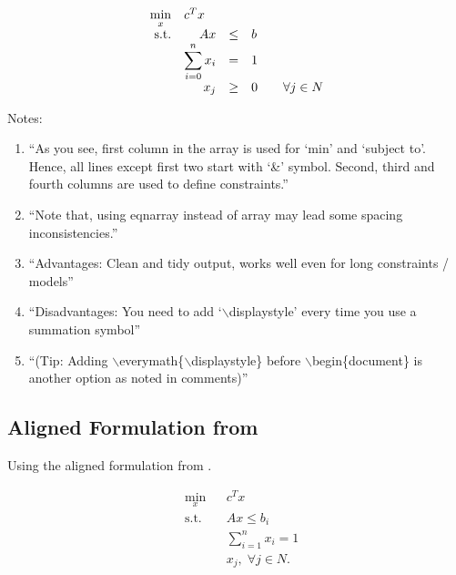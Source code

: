 \documentclass[letter,12pt]{article}
\begin{document}
\begin{equation}
\begin{array}{rrclcl}
\displaystyle \min_{x} & \multicolumn{3}{l}{c^T x} \\
\textrm{s.t.} & A x & \leq & b \\
&\displaystyle \sum_{i=0}^{n} x_i & = & 1 \\
& x_j & \geq & 0 & & \forall j \in N \\
\end{array}
\end{equation}


Notes: \vspace{-0.3cm}
\begin{enumerate} \itemsep -4pt
\item ``As you see, first column in the array is used for `min' and `subject to'. Hence, all lines except first two start with `\&' symbol. Second, third and fourth columns are used to define constraints.''
\item ``Note that, using eqnarray instead of array may lead some spacing inconsistencies.''
\item ``Advantages: Clean and tidy output, works well even for long constraints / models''
\item ``Disadvantages: You need to add `$\backslash$displaystyle' every time you use a summation symbol''
\item ``(Tip: Adding $\backslash$everymath\{$\backslash$displaystyle\} before $\backslash$begin\{document\} is another option as noted in comments)''
\end{enumerate}


\subsection{Aligned Formulation from \cite{Cay2013}}
\label{ssec:AlignedFormulationFromCay2013}

Using the aligned formulation from \cite{Cay2013}.



\begin{equation}
\begin{aligned}
& \underset{x}{\text{min}}
& & c^T x \\
& \text{s.t.} & &  Ax \leq b_i \\
& & &  \sum_{i=1}^{n} x_i =1 \\
& & &  x_j, \; \forall j \in N. \\
\end{aligned}
\end{equation}
\end{document}
